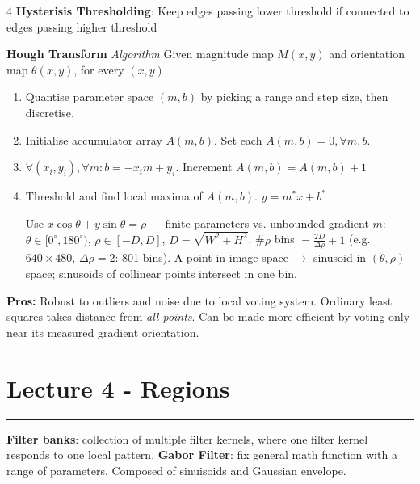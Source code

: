 \documentclass[10pt]{extarticle}
\newcommand{\sectionrule}{\vspace{-2pt}\hrule\vspace{2pt}}
\begin{document}
\begin{multicols}{4}
\textbf{Hysterisis Thresholding}: Keep edges passing lower threshold if connected to edges passing higher threshold

\textbf{Hough Transform}
\textit{Algorithm} Given magnitude map $M(x, y)$ and orientation map $\theta(x, y)$, for every $(x, y)$
\begin{enumerate}
    \item Quantise parameter space $(m, b)$ by picking a range and step size, then discretise.
    \item Initialise accumulator array $A(m, b)$. Set each $A(m, b) = 0,  \forall m, b$.
    \item $\forall (x_i, y_i), \forall m: b = -x_im + y_i$. Increment $A(m, b) = A(m, b) + 1$
    \item Threshold and find local maxima of $A(m, b)$. $y = m^*x + b^*$
    \begin{formulabox}
        Use $x\cos\theta + y\sin\theta = \rho$ — finite parameters vs. unbounded gradient $m$: $\theta \in [0^\circ, 180^\circ)$, $\rho \in [-D, D]$, $D = \sqrt{W^2 + H^2}$. \#$\rho$ bins $= \tfrac{2D}{\Delta\rho} + 1$ (e.g.\ $640 \times 480$, $\Delta\rho = 2$: 801 bins). A point in image space $\to$ sinusoid in $(\theta, \rho)$ space; sinusoids of collinear points intersect in one bin.
    \end{formulabox}
\end{enumerate}
\textbf{Pros: } Robust to outliers and noise due to local voting system. Ordinary least squares takes distance from \textit{all points}.
Can be made more efficient by voting only near its measured gradient orientation.

\section*{Lecture 4 - Regions}
\sectionrule
\textbf{Filter banks}: collection of multiple filter kernels, where one filter kernel responds to one local pattern.
\textbf{Gabor Filter}: fix general math function with a range of parameters. Composed of sinuisoids and Gaussian envelope.


\end{multicols}
\end{document}
